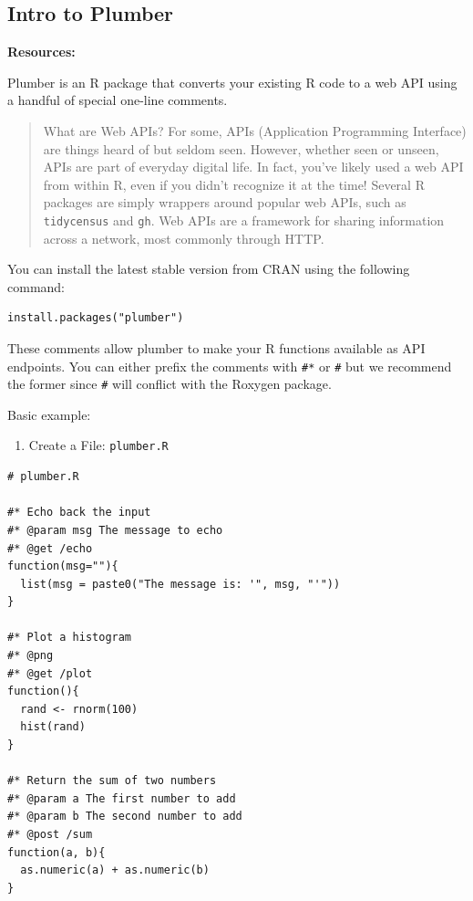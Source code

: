 \documentclass[]{book}
\providecommand{\tightlist}{%
  \setlength{\itemsep}{0pt}\setlength{\parskip}{0pt}}
\theoremstyle{definition}
\theoremstyle{definition}
\theoremstyle{definition}
\theoremstyle{remark}
\begin{document}
\hypertarget{intro-to-plumber}{%
\subsection{Intro to Plumber}\label{intro-to-plumber}}

\textbf{Resources:}

Plumber is an R package that converts your existing R code to a web API
using a handful of special one-line comments.

\begin{quote}
What are Web APIs? For some, APIs (Application Programming Interface)
are things heard of but seldom seen. However, whether seen or unseen,
APIs are part of everyday digital life. In fact, you've likely used a
web API from within R, even if you didn't recognize it at the time!
Several R packages are simply wrappers around popular web APIs, such as
\texttt{tidycensus} and \texttt{gh}. Web APIs are a framework for
sharing information across a network, most commonly through HTTP.
\end{quote}

You can install the latest stable version from CRAN using the following
command:

\begin{verbatim}
install.packages("plumber")
\end{verbatim}

These comments allow plumber to make your R functions available as API
endpoints. You can either prefix the comments with \texttt{\#*} or
\texttt{\#\textquotesingle{}} but we recommend the former since
\texttt{\#\textquotesingle{}} will conflict with the Roxygen package.

Basic example:

\begin{enumerate}
\def\labelenumi{\arabic{enumi}.}
\tightlist
\item
  Create a File: \texttt{plumber.R}
\end{enumerate}

\begin{verbatim}
# plumber.R

#* Echo back the input
#* @param msg The message to echo
#* @get /echo
function(msg=""){
  list(msg = paste0("The message is: '", msg, "'"))
}

#* Plot a histogram
#* @png
#* @get /plot
function(){
  rand <- rnorm(100)
  hist(rand)
}

#* Return the sum of two numbers
#* @param a The first number to add
#* @param b The second number to add
#* @post /sum
function(a, b){
  as.numeric(a) + as.numeric(b)
}
\end{verbatim}
\end{document}
